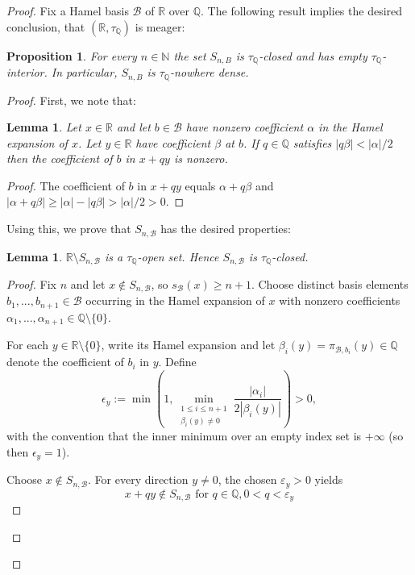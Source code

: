 \documentclass[11pt]{amsart} %
\newtheorem{lemma}[theorem]{Lemma}
\newtheorem{proposition}[theorem]{Proposition}
\theoremstyle{definition}
\newcommand{\B}{\mathcal{B}}
\newcommand{\R}{\mathbb{R}}
\newcommand{\Q}{\mathbb{Q}}
\begin{document}
\begin{proof}
Fix a Hamel basis $\mathcal{B}$ of $\mathbb{R}$ over $\mathbb{Q}$.  The following result implies the desired conclusion, that $(\mathbb{R},\tau_{\Q})$ is meager:

\begin{proposition}
\label{prop:7.2}
For every $n\in\mathbb{N}$ the set $S_{n,B}$ is $\tau_{\Q}$-closed and has empty $\tau_{\Q}$-interior. In particular, $S_{n,B}$ is $\tau_{\Q}$-nowhere dense.
\end{proposition}

\begin{proof}
First, we note that:

\begin{lemma} 
Let $x\in\mathbb{R}$ and let $b\in\mathcal{B}$ have nonzero coefficient $\alpha$ in the Hamel expansion of $x$. Let $y\in\mathbb{R}$ have coefficient $\beta$ at $b$. If $q\in\mathbb{Q}$ satisfies $|q\beta|<|\alpha|/2$ then the coefficient of $b$ in $x+qy$ is nonzero.
\end{lemma} 

\begin{proof}
The coefficient of $b$ in $x+qy$ equals $\alpha+q\beta$ and $|\alpha+q\beta|\ge|\alpha|-|q\beta|>|\alpha|/2>0$.
\end{proof}

Using this, we prove that $S_{n,\B}$ has the desired properties:
\begin{lemma} 
$\R\setminus S_{n,\B}$ is a $\tau_{\Q}$-open set. Hence $S_{n,\B}$ is $\tau_{\Q}$-closed.
\end{lemma} 
\begin{proof} 
Fix $n$ and let $x\notin S_{n,\B}$, so $s_\B(x)\ge n+1$. Choose distinct basis elements $b_{1},...,b_{n+1}\in\mathcal{B}$ occurring in the Hamel expansion of $x$ with nonzero coefficients $\alpha_{1},...,\alpha_{n+1}\in\mathbb{Q}\setminus\{0\}$.

For each $y\in\mathbb{R}\setminus\{0\}$, write its Hamel expansion and let $\beta_{i}(y)=\pi_{\B,b_i}(y)\in\mathbb{Q}$ denote the coefficient of $b_{i}$ in $y$. Define
\begin{equation} 
\epsilon_{y}:=\min\left(1,\min_{\substack{1\le i\le n+1 \\ \beta_{i}(y)\ne0}}\frac{|\alpha_{i}|}{2|\beta_{i}(y)|}\right)>0, \end{equation} 
with the convention that the inner minimum over an empty index set is $+\infty$ (so then $\epsilon_{y}=1$). 


Choose $x\not\in S_{n,\B}$. For every direction $y\neq 0$, the chosen $\varepsilon_y>0$ yields 
\begin{equation} 
x+qy\not\in S_{n,\B}\mbox{ for }q\in \Q, 0<q<\varepsilon_{y}
\end{equation} 
\end{proof} 


\end{proof}
\end{proof}
\end{document}
